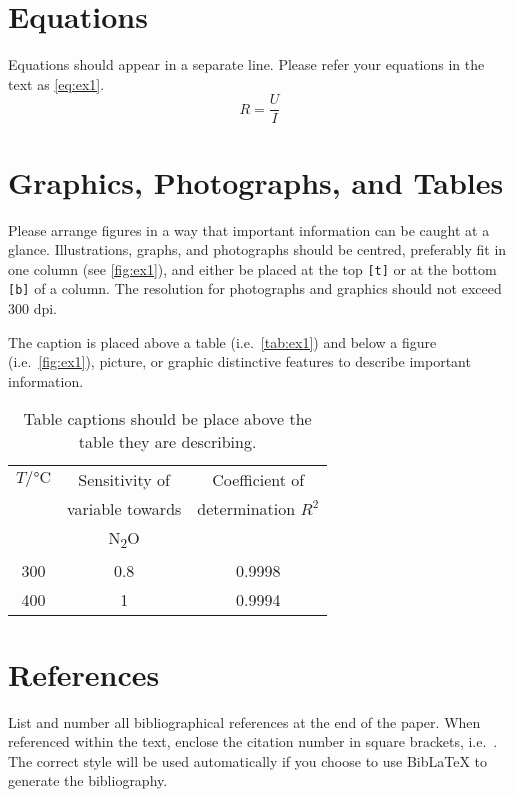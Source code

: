 \documentclass{ama}
\begin{document}
\section{Equations}
Equations should appear in a separate line.
Please refer your equations in the text as \autoref{eq:ex1}.
\begin{equation}
    R = \frac{U}{I}\label{eq:ex1}
\end{equation}

\section{Graphics, Photographs, and Tables}
Please arrange figures in a way that important information can be caught at a glance.
Illustrations, graphs, and photographs should be centred, preferably fit in one column (see \autoref{fig:ex1}), and either be placed at the top \texttt{[t]} or at the bottom \texttt{[b]} of a column.
The resolution for photographs and graphics should not exceed 300 dpi.

The caption is placed above a table (i.e.\ \autoref{tab:ex1}) and below a figure (i.e.\ \autoref{fig:ex1}), picture, or graphic distinctive features to describe important information.
%
\begin{table}
    \caption{Table captions should be place above the table they are describing.}\label{tab:ex1}
    \centering
    \begin{tabular}{ccc}
        \toprule
        \(T / \si{\celsius}\) & Sensitivity of & Coefficient of \\
        & variable towards & determination \(R^2\)  \\
        & N\textsubscript{2}O & \\
        \midrule
        \num{300} & \num{0.8} & \num{0.9998} \\
        \midrule
        \num{400} & \num{1} & \num{0.9994} \\
        \bottomrule
    \end{tabular}
\end{table}

\section{References}
List and number all bibliographical references at the end of the paper.
When referenced within the text, enclose the citation number in square brackets, i.e.~\cite{mouse2011}.
The correct style will be used automatically if you choose to use Bib\LaTeX{} to generate the bibliography.
\end{document}
